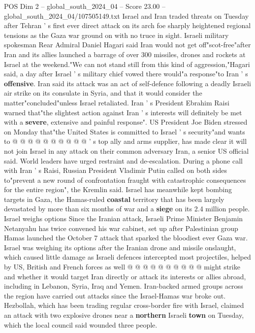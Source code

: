 \begin{textsample}{POS Dim 2 – global\_south\_2024\_04 – Score 23.00 – global\_south\_2024\_04/107505149.txt}  \label{ex:f2_pos_158}
Israel and Iran traded threats on Tuesday after Tehran ' s first ever direct attack on its arch foe sharply heightened regional tensions as the Gaza war ground on with no truce in sight.
Israeli military spokesman Rear Admiral Daniel Hagari said Iran would not get off"scot-free"after Iran and its allies launched a barrage of over 300 missiles, drones and rockets at Israel at the weekend."We can not stand still from this kind of aggression,"Hagari said, a day after Israel ' s military chief vowed there would"a response"to Iran ' s \textbf{offensive}.
Iran said its attack was an act of self-defence following a deadly Israeli air strike on its consulate in Syria, and that it would consider the matter"concluded"unless Israel retaliated.
Iran ' s President Ebrahim Raisi warned that"the slightest action against Iran ' s interests will definitely be met with a \textbf{severe}, extensive and painful response".
US President Joe Biden stressed on Monday that"the United States is committed to Israel ' s security"and wants to @ @ @ @ @ @ @ @ @ @ ' s top ally and arms supplier, has made clear it will not join Israel in any attack on their common adversary Iran, a senior US official said.
World leaders have urged restraint and de-escalation.
During a phone call with Iran ' s Raisi, Russian President Vladimir Putin called on both sides to"prevent a new round of confrontation fraught with catastrophic consequences for the entire region", the Kremlin said.
Israel has meanwhile kept bombing targets in Gaza, the Hamas-ruled \textbf{coastal} territory that has been largely devastated by more than six months of war and a \textbf{siege} on its 2.4 million people.
Israel weighs options Since the Iranian attack, Israeli Prime Minister Benjamin Netanyahu has twice convened his war cabinet, set up after Palestinian group Hamas launched the October 7 attack that sparked the bloodiest ever Gaza war.
Israel was weighing its options after the Iranian drone and missile onslaught, which caused little damage as Israeli defences intercepted most projectiles, helped by US, British and French forces as well @ @ @ @ @ @ @ @ @ @ might strike and whether it would target Iran directly or attack its interests or allies abroad, including in Lebanon, Syria, Iraq and Yemen.
Iran-backed armed groups across the region have carried out attacks since the Israel-Hamas war broke out.
Hezbollah, which has been trading regular cross-border fire with Israel, claimed an attack with two explosive drones near a \textbf{northern} Israeli \textbf{town} on Tuesday, which the local council said wounded three people.

\end{textsample}
